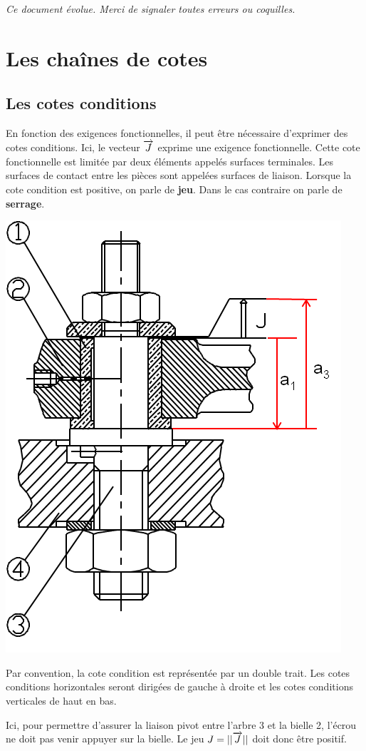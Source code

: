 \documentclass[11pt,oneside]{article}
\begin{document}
\setlength{\parskip}{0ex plus 0.2ex minus 0ex}
 \renewcommand{\contentsname}{}
 \renewcommand{\baselinestretch}{1}

\tableofcontents

 \renewcommand{\baselinestretch}{1.2}
\setlength{\parskip}{2ex plus 0.5ex minus 0.2ex}

\textit{Ce document évolue. Merci de signaler toutes erreurs ou coquilles.}

\section{Les chaînes de cotes \cite{cf}}
\subsection{Les cotes conditions}
En fonction des exigences fonctionnelles, il peut être nécessaire d'exprimer des cotes conditions. Ici, le vecteur $\overrightarrow{J}$ exprime une exigence fonctionnelle. Cette cote fonctionnelle est limitée par deux éléments appelés surfaces terminales. Les surfaces de contact entre les pièces sont appelées surfaces de liaison. Lorsque la cote condition est positive, on parle de \textbf{jeu}. Dans le cas contraire on parle de \textbf{serrage}.

\begin{center}
\includegraphics[width=.4\textwidth]{png/assemblage}
\end{center}

Par convention, la cote condition est représentée par un double trait. Les cotes conditions horizontales seront dirigées de gauche à droite et les cotes conditions verticales de haut en bas. 

Ici, pour permettre d'assurer la liaison pivot entre l'arbre 3 et la bielle 2, l'écrou ne doit pas venir appuyer sur la bielle. Le jeu $J=||\overrightarrow{J}||$ doit donc être positif.
\end{document}
